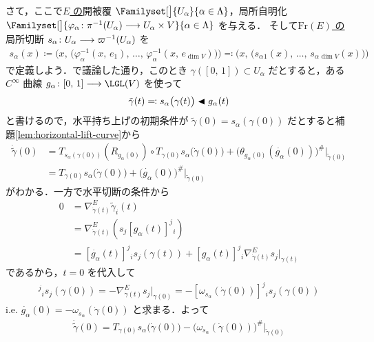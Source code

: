 \documentclass[TQFT_main]{subfiles}
\begin{document}
さて，ここで\underline{$E$ の}開被覆 $\Familyset[\big]{U_\alpha}{\alpha \in \Lambda}$，局所自明化 $\Familyset[\big]{\varphi_\alpha \colon \pi^{-1}(U_\alpha) \lto U_\alpha \times V}{\alpha \in \Lambda}$ を与える．
そして\underline{$\mathrm{Fr}(E)$ の}局所切断 $s_\alpha \colon U_\alpha \longrightarrow \varpi^{-1}(U_\alpha)$ を 
\begin{align}
    s_\alpha(x) \coloneqq \bigl( x,\, \bigl( \varphi_\alpha^{-1}(x,\, e_1),\, \dots,\, \varphi_\alpha^{-1}(x,\, e_{\dim V}) \bigr)  \bigr) \eqqcolon \bigl( x,\, \bigl( s_\alpha{}_1(x),\, \dots,\, s_\alpha{}_{\dim V}(x)\bigr)  \bigr)
\end{align}
で定義しよう．で議論した通り，このとき $\gamma([0,\, 1]) \subset U_\alpha$ だとすると，ある $C^\infty$ 曲線 $g_\alpha \colon [0,\, 1] \lto \LGL(V)$ を使って
\begin{align}
    \tilde{\gamma}(t) \eqqcolon s_\alpha \bigl( \gamma(t) \bigr) \blacktriangleleft g_\alpha(t)
\end{align}
と書けるので，水平持ち上げの初期条件が $\tilde{\gamma}(0) = s_\alpha( \gamma(0))$ だとすると補題\ref{lem:horizontal-lift-curve}から
\begin{align}
    \dot{\tilde{\gamma}}(0) 
    &= T_{s_\alpha(\gamma(0))} (R_{g_\alpha(0)}) \circ T_{\gamma(0)} s_\alpha \bigl( \dot{\gamma}(0) \bigr)  + \bigl( \theta_{g_\alpha(0)}(\dot{g_\alpha}(0)) \bigr)^\#|_{\tilde{\gamma}(0)} \\
    &= T_{\gamma(0)} s_\alpha \bigl( \dot{\gamma}(0) \bigr)  + \bigl( \dot{g_\alpha}(0) \bigr)^\#|_{\tilde{\gamma}(0)}
\end{align}
がわかる．一方で水平切断の条件から
\begin{align}
    0
    &=\nabla^E_{\dot{\gamma}(t)} \tilde{\gamma}_i(t) \\
    &= \nabla^E_{\dot{\gamma}(t)}(s_j[g_\alpha(t)]^{j}{}_i) \\
    &= [\dot{g_\alpha}(t)]^j{}_i s_j(\gamma(t)) + [g_\alpha(t)]^{j}{}_i \nabla^E_{\dot{\gamma}(t)} s_j|_{\gamma(t)}
\end{align}
であるから，$t=0$ を代入して
\begin{align}
    [\dot{g_\alpha}(0)]^j{}_i s_j(\gamma(0)) = -\nabla^E_{\dot{\gamma}(t)} s_j|_{\gamma(0)} = -[\omega_{s_\alpha}(\dot{\gamma}(0))]^j{}_i s_j(\gamma(0))
\end{align}
i.e. $\dot{g_\alpha}(0) = -\omega_{s_\alpha}(\dot{\gamma}(0))$ と求まる．よって
\begin{align}
    \label{eq:horizontal-vect}
    \dot{\tilde{\gamma}}(0)  = T_{\gamma(0)} s_\alpha \bigl( \dot{\gamma}(0) \bigr)  - \bigl( \omega_{s_\alpha}(\dot{\gamma}(0)) \bigr)^\#|_{\tilde{\gamma}(0)}
\end{align}
\end{document}
